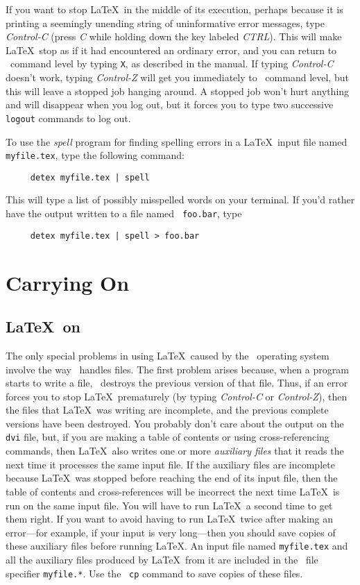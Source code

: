 If you want to stop \LaTeX\ in the middle of its execution, perhaps
because it is printing a seemingly unending string of uninformative
error messages, type {\em Control-C\/} (press {\em C} while holding down
the key labeled {\em CTRL\/}).  This will make \LaTeX\ stop as if it
had encountered an ordinary error, and you can return to \UNIX\ command
level by typing {\tt X}, as described in the manual.  If typing {\em
Control-C\/} doesn't work, typing {\em Control-Z\/} will get you
immediately to \UNIX\ command level, but this will leave a stopped job
hanging around.  A stopped job won't hurt anything and will disappear
when you log out, but it forces you to type two successive \mbox{\tt
logout} commands to log out.

\sloppy
To use the {\em spell\/} program for finding spelling errors in a
\LaTeX\ input file named \mbox{\tt myfile.tex}, type the following
command:
\begin{verbatim}
     detex myfile.tex | spell
\end{verbatim}
This will type a list of possibly misspelled words on your terminal.
If you'd rather have the output written to a file named \mbox{\tt
foo.bar}, type
\begin{verbatim}
     detex myfile.tex | spell > foo.bar
\end{verbatim}

\section{Carrying On}

\subsection{\LaTeX\ on \UNIX} \label{sec:op-system}

The only special problems in using \LaTeX\ caused by the \UNIX\
operating system involve the way \UNIX\ handles files.  The first
problem arises because, when a program starts to write a file, \UNIX\
destroys the previous version of that file.  Thus, if an error forces
you to stop \LaTeX\ prematurely (by typing {\em Control-C\/} or {\em
Control-Z\/}), then the files that \LaTeX\ was writing are incomplete,
and the previous complete versions have been destroyed.  You probably
don't care about the output on the {\tt dvi} file, but, if you are
making a table of contents or using cross-referencing commands, then
\LaTeX\ also writes one or more {\em auxiliary files\/} that it reads
the next time it processes the same input file.  If the auxiliary files
are incomplete because \LaTeX\ was stopped before reaching the end of
its input file, then the table of contents and cross-references will be
incorrect the next time \LaTeX\ is run on the same input file.  You
will have to run \LaTeX\ a second time to get them right.  If you want
to avoid having to run \LaTeX\ twice after making an error---for
example, if your input is very long---then you should save copies of
these auxiliary files before running \LaTeX. An input file named
\mbox{\tt myfile.tex} and all the auxiliary files produced by \LaTeX\
from it are included in the \UNIX\ file specifier \mbox{\tt myfile.*}.
Use the \UNIX\ {\tt cp} command to save copies of these files.

